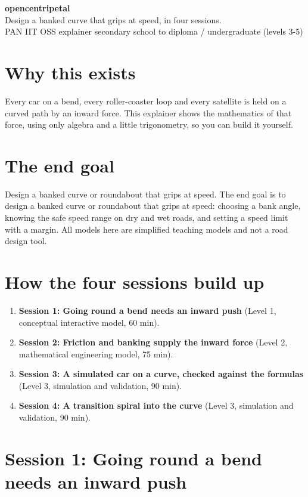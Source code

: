 \documentclass[11pt,a4paper]{article}
\begin{document}
\begin{center}{\LARGE\bfseries opencentripetal}\\[0.4em]{\large Design a banked curve that grips at speed, in four sessions.}\\[0.2em]\small PAN IIT OSS explainer \textbullet{} secondary school to diploma / undergraduate (levels 3-5)\end{center}

\section*{Why this exists}
Every car on a bend, every roller-coaster loop and every satellite is held on a curved path by an inward force. This explainer shows the mathematics of that force, using only algebra and a little trigonometry, so you can build it yourself.

\section*{The end goal}
Design a banked curve or roundabout that grips at speed. The end goal is to design a banked curve or roundabout that grips at speed: choosing a bank angle, knowing the safe speed range on dry and wet roads, and setting a speed limit with a margin. All models here are simplified teaching models and not a road design tool.

\section*{How the four sessions build up}
\begin{enumerate}[nosep]
\item \textbf{Session 1: Going round a bend needs an inward push} (Level 1, conceptual interactive model, 60 min).
\item \textbf{Session 2: Friction and banking supply the inward force} (Level 2, mathematical engineering model, 75 min).
\item \textbf{Session 3: A simulated car on a curve, checked against the formulas} (Level 3, simulation and validation, 90 min).
\item \textbf{Session 4: A transition spiral into the curve} (Level 3, simulation and validation, 90 min).
\end{enumerate}

\section{Session 1: Going round a bend needs an inward push}
\end{document}
